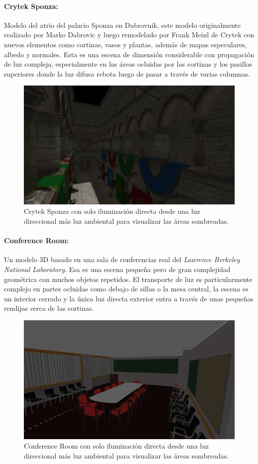 \paragraph{Crytek Sponza:} Modelo del atrio del palacio Sponza en Dubrovnik, este modelo originalmente realizado por Marko Dabrovic y luego remodelado por Frank Meinl de Crytek con nuevos elementos como cortinas, vasos y plantas, además de mapas especulares, albedo y normales. Esta es una escena de dimensión considerable con propagación de luz compleja, especialmente en las áreas ocluidas por las cortinas y los pasillos superiores donde la luz difusa rebota luego de pasar a través de varias columnas.

\begin{figure}[H]
	\centering
	\includegraphics[width=0.65\linewidth]{media/scenes/sponza.png}
	\caption{Crytek Sponza con solo iluminación directa desde una luz direccional más luz ambiental para visualizar las áreas sombreadas.}
	\label{fig:crytek_sponza}
\end{figure}

\paragraph{Conference Room:} Un modelo 3D basado en una sala de conferencias real del \emph{Lawrence Berkeley National Laboratory}. Esa es una escena pequeña pero de gran complejidad geométrica con muchos objetos repetidos. El transporte de luz es particularmente complejo en partes ocluidas como debajo de sillas o la mesa central, la escena es un interior cerrado y la única luz directa exterior entra a través de unas pequeñas rendijas cerca de las cortinas.

\begin{figure}[H]
	\centering
	\includegraphics[width=0.65\linewidth]{media/scenes/conference.png}
	\caption{Conference Room con solo iluminación directa desde una luz direccional más luz ambiental para visualizar las áreas sombreadas.}
	\label{fig:conference}
\end{figure}

